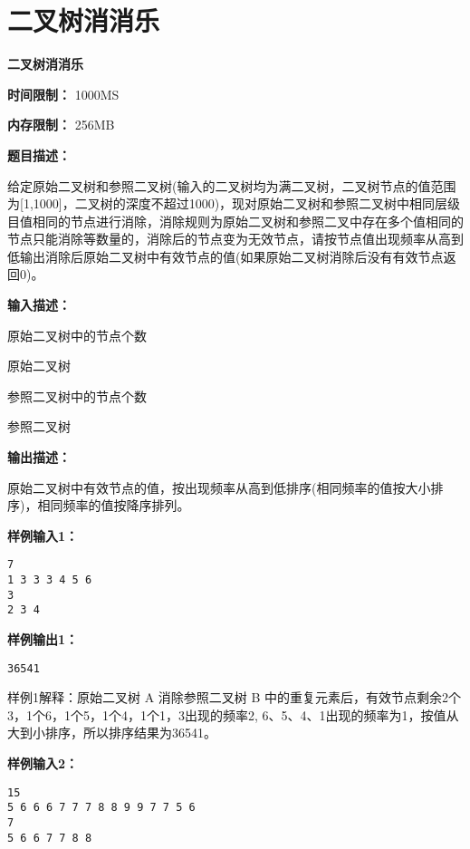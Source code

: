 \documentclass[a4paper]{ctexart}
\begin{document}
	
\section{二叉树消消乐}
	
\begin{center}
	\Large \textbf{二叉树消消乐}
\end{center}
	
\noindent\textbf{时间限制：} 1000MS
	
\noindent\textbf{内存限制：} 256MB
	
\vspace{10pt}
	
\noindent\textbf{题目描述：}
	
给定原始二叉树和参照二叉树(输入的二叉树均为满二叉树，二叉树节点的值范围为[1,1000]，二叉树的深度不超过1000)，现对原始二叉树和参照二叉树中相同层级目值相同的节点进行消除，消除规则为原始二叉树和参照二叉中存在多个值相同的节点只能消除等数量的，消除后的节点变为无效节点，请按节点值出现频率从高到低输出消除后原始二叉树中有效节点的值(如果原始二叉树消除后没有有效节点返回0)。
	
\noindent\textbf{输入描述：}
	
原始二叉树中的节点个数

原始二叉树

参照二叉树中的节点个数

参照二叉树
	
\noindent\textbf{输出描述：} 
	
原始二叉树中有效节点的值，按出现频率从高到低排序(相同频率的值按大小排序)，相同频率的值按降序排列。
	
\noindent\textbf{样例输入1：}
	
\lstset{numbers=none}
\begin{lstlisting}
7
1 3 3 3 4 5 6
3
2 3 4
\end{lstlisting}
\lstset{numbers=left}
	
\noindent\textbf{样例输出1：}
\lstset{numbers=none}
\begin{lstlisting}
36541
\end{lstlisting}
\lstset{numbers=left}
	
\noindent 样例1解释：原始二叉树 A 消除参照二叉树 B 中的重复元素后，有效节点剩余2个3，1个6，1个5，1个4，1个1，3出现的频率2, 6、5、4、1出现的频率为1，按值从大到小排序，所以排序结果为36541。



\noindent\textbf{样例输入2：}
	
\lstset{numbers=none}
\begin{lstlisting}
15
5 6 6 6 7 7 7 8 8 9 9 7 7 5 6
7
5 6 6 7 7 8 8
\end{lstlisting}
\lstset{numbers=left}
	
\end{document}
